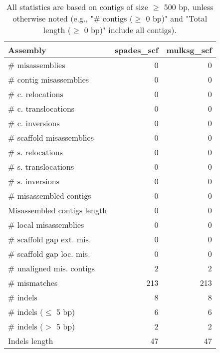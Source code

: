 \documentclass[12pt,a4paper]{article}
\begin{document}
\begin{table}[ht]
\begin{center}
\caption{All statistics are based on contigs of size $\geq$ 500 bp, unless otherwise noted (e.g., "\# contigs ($\geq$ 0 bp)" and "Total length ($\geq$ 0 bp)" include all contigs).}
\begin{tabular}{|l*{2}{|r}|}
\hline
Assembly & spades\_scf & mulksg\_scf \\ \hline
\# misassemblies & 0 & 0 \\ \hline
\hspace{2mm}\# contig misassemblies & 0 & 0 \\ \hline
\hspace{5mm}\# c. relocations & 0 & 0 \\ \hline
\hspace{5mm}\# c. translocations & 0 & 0 \\ \hline
\hspace{5mm}\# c. inversions & 0 & 0 \\ \hline
\hspace{2mm}\# scaffold misassemblies & 0 & 0 \\ \hline
\hspace{5mm}\# s. relocations & 0 & 0 \\ \hline
\hspace{5mm}\# s. translocations & 0 & 0 \\ \hline
\hspace{5mm}\# s. inversions & 0 & 0 \\ \hline
\# misassembled contigs & 0 & 0 \\ \hline
Misassembled contigs length & 0 & 0 \\ \hline
\# local misassemblies & 0 & 0 \\ \hline
\# scaffold gap ext. mis. & 0 & 0 \\ \hline
\# scaffold gap loc. mis. & 0 & 0 \\ \hline
\# unaligned mis. contigs & 2 & 2 \\ \hline
\# mismatches & 213 & 213 \\ \hline
\# indels & 8 & 8 \\ \hline
\hspace{5mm}\# indels ($\leq$ 5 bp) & 6 & 6 \\ \hline
\hspace{5mm}\# indels ($>$ 5 bp) & 2 & 2 \\ \hline
Indels length & 47 & 47 \\ \hline
\end{tabular}
\end{center}
\end{table}
\end{document}
